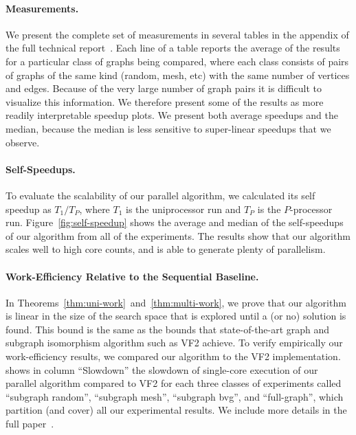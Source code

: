 \paragraph{Measurements.}
%
%
We present the complete set of measurements in several tables in
the appendix of the full technical report~\cite{YA-iso-18}.
%
Each line of a table reports the average of the results for a
particular class of graphs being compared, where each class consists of
pairs of graphs of the same kind (random, mesh, etc) with the same
number of vertices and edges.
%
Because of the very large number of graph pairs it is difficult
to visualize this information.
%
We therefore present some of the results as more readily
interpretable speedup plots.
%
We present both average speedups and the median,
because the median is less sensitive to super-linear speedups that we
observe.

\paragraph{Self-Speedups.}
To evaluate the scalability of our parallel algorithm, we calculated
its self speedup as $T_1/T_P$, where $T_1$ is the uniprocessor run and
$T_P$ is the $P$-processor run.
%
Figure~\ref{fig:self-speedup} shows the average and median
of the self-speedups of our algorithm from all of the experiments.
%
The results
show that our algorithm scales well to high core counts,
and is able to generate plenty of parallelism.


\paragraph{Work-Efficiency Relative to the Sequential Baseline.}  In
Theorems~\ref{thm:uni-work}~and~\ref{thm:multi-work}, we prove that
our algorithm is linear in the size of the search space that is
explored until a (or no) solution is found.
%
This bound is the same as the bounds that state-of-the-art graph and
subgraph isomorphism algorithm such as VF2 achieve.
%
To verify empirically our work-efficiency results, we compared our
algorithm to the VF2 implementation.
%
 shows in column ``Slowdown'' the slowdown of
single-core execution of our parallel algorithm compared to VF2 for
each three classes of experiments called ``subgraph random'',
``subgraph mesh'', ``subgraph bvg'', and ``full-graph'', which partition (and cover) all our
experimental results.
%
We include more details in the full paper~\cite{YA-iso-18}.


